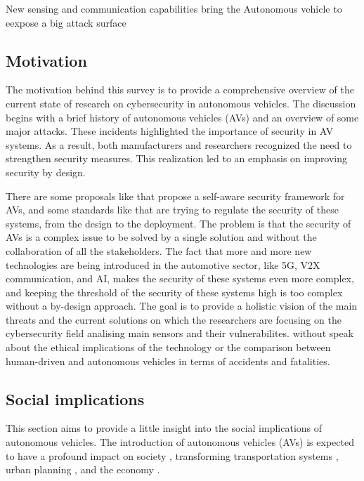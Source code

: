 New sensing and communication capabilities bring the Autonomous vehicle to eexpose a big attack surface  \cite{unknown2020connected}
\cite{cybersec}

\subsection{Motivation}\label{subsec:motivation}

The motivation behind this survey is to provide a comprehensive overview of the current state of research on cybersecurity in autonomous vehicles.
The discussion begins with a brief history of autonomous vehicles (AVs) and an overview of some major attacks.
These incidents highlighted the importance of security in AV systems.
As a result, both manufacturers and researchers recognized the need to strengthen security measures.
This realization led to an emphasis on improving security by design.

There are some proposals like \cite{adu-kyere2023self-aware} that propose a self-aware security framework for AVs, and some standards like \cite{iso_21434_2021} that are trying to regulate the security of these systems, from the design to the deployment.
The problem is that the security of AVs is a complex issue to be solved by a single solution and without the collaboration of all the stakeholders.
The fact that more and more new technologies are being introduced in the automotive sector, like 5G, V2X communication, and AI, makes the security of these systems even more complex, and keeping the threshold of the security of these systems high is too complex without a by-design approach.
The goal is to provide a holistic vision of the main threats and the current solutions on which the researchers are focusing on the cybersecurity field analising main sensors and their vulnerabilites. without speak about the ethical implications of the technology or the comparison between human-driven and autonomous vehicles in terms of accidents and fatalities.


\subsection{Social implications}\label{subsec:social-implications}

This section aims to provide a little insight into the social implications of autonomous vehicles.
The introduction of autonomous vehicles (AVs) is expected to have a profound impact on society \cite{thomas2020perception}, transforming transportation systems \cite{intelligent_transportation_2023}
, urban planning \cite{impact_autonomous_vehicles_2018}, and the economy \cite{economic_aspects_2020}.

